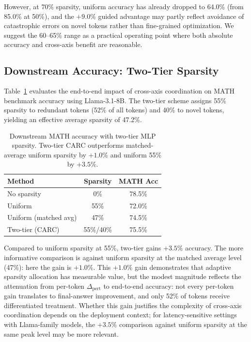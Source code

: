\documentclass[11pt,a4paper]{article}
\begin{document}
However, at 70\% sparsity, uniform accuracy has already dropped to 64.0\% (from 85.0\% at 50\%), and the $+9.0\%$ guided advantage may partly reflect avoidance of catastrophic errors on novel tokens rather than fine-grained optimization.
We suggest the 60--65\% range as a practical operating point where both absolute accuracy and cross-axis benefit are reasonable.

\subsection{Downstream Accuracy: Two-Tier Sparsity}
\label{sec:downstream}

Table~\ref{tab:downstream} evaluates the end-to-end impact of cross-axis coordination on MATH benchmark accuracy using Llama-3.1-8B.
The two-tier scheme assigns 55\% sparsity to redundant tokens (52\% of all tokens) and 40\% to novel tokens, yielding an effective average sparsity of 47.2\%.

\begin{table}[t]
\centering
\small
\begin{tabular}{lcc}
\toprule
\textbf{Method} & \textbf{Sparsity} & \textbf{MATH Acc} \\
\midrule
No sparsity            & 0\%        & 78.5\% \\
Uniform                & 55\%       & 72.0\% \\
Uniform (matched avg)  & 47\%       & 74.5\% \\
Two-tier (CARC)        & 55\%/40\%  & 75.5\% \\
\bottomrule
\end{tabular}
\caption{Downstream MATH accuracy with two-tier MLP sparsity. Two-tier CARC outperforms matched-average uniform sparsity by $+1.0\%$ and uniform 55\% by $+3.5\%$.}
\label{tab:downstream}
\end{table}

Compared to uniform sparsity at 55\%, two-tier gains $+3.5\%$ accuracy.
The more informative comparison is against uniform sparsity at the matched average level (47\%): here the gain is $+1.0\%$.
This $+1.0\%$ gain demonstrates that adaptive sparsity allocation has measurable value, but the modest magnitude reflects the attenuation from per-token $\Delta_\text{pert}$ to end-to-end accuracy: not every per-token gain translates to final-answer improvement, and only 52\% of tokens receive differentiated treatment.
Whether this gain justifies the complexity of cross-axis coordination depends on the deployment context; for latency-sensitive settings with Llama-family models, the $+3.5\%$ comparison against uniform sparsity at the same peak level may be more relevant.
\end{document}

